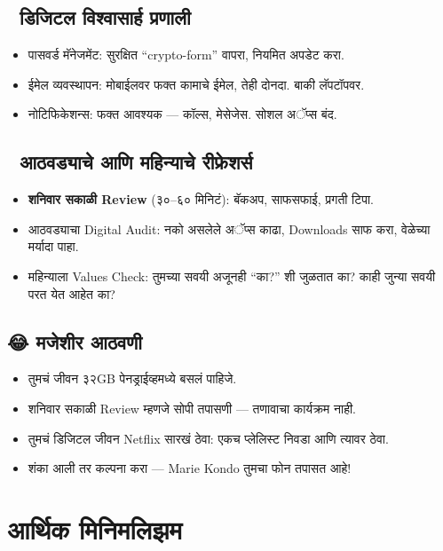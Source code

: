 \section*{🧠 डिजिटल विश्वासार्ह प्रणाली}

\begin{itemize}
  \item पासवर्ड मॅनेजमेंट: सुरक्षित “crypto-form” वापरा, नियमित अपडेट करा.  
  \item ईमेल व्यवस्थापन: मोबाईलवर फक्त कामाचे ईमेल, तेही दोनदा. बाकी लॅपटॉपवर.  
  \item नोटिफिकेशन्स: फक्त आवश्यक — कॉल्स, मेसेजेस. सोशल अॅप्स बंद.  
\end{itemize}

\section*{📅 आठवड्याचे आणि महिन्याचे रीफ्रेशर्स}

\begin{itemize}
  \item \textbf{शनिवार सकाळी Review} (३०–६० मिनिटं): बॅकअप, साफसफाई, प्रगती टिपा.  
  \item आठवड्याचा Digital Audit: नको असलेले अॅप्स काढा, Downloads साफ करा, वेळेच्या मर्यादा पाहा.  
  \item महिन्याला Values Check: तुमच्या सवयी अजूनही “का?” शी जुळतात का? काही जुन्या सवयी परत येत आहेत का?  
\end{itemize}

\section*{😂 मजेशीर आठवणी}

\begin{itemize}
  \item तुमचं जीवन ३२GB पेनड्राईव्हमध्ये बसलं पाहिजे.  
  \item शनिवार सकाळी Review म्हणजे सोपी तपासणी — तणावाचा कार्यक्रम नाही.  
  \item तुमचं डिजिटल जीवन Netflix सारखं ठेवा: एकच प्लेलिस्ट निवडा आणि त्यावर ठेवा.  
  \item शंका आली तर कल्पना करा — Marie Kondo तुमचा फोन तपासत आहे!  
\end{itemize}


\chapter{आर्थिक मिनिमलिझम}


